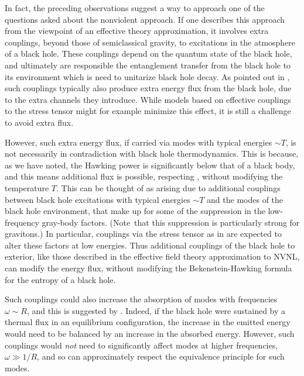 In fact, the preceding observations suggest a way to approach one of the questions asked about the nonviolent approach.  If one describes this approach from the viewpoint of an effective theory approximation,  it involves extra couplings, beyond those of semiclassical gravity, to excitations in the atmosphere of a black hole.  These couplings depend on the quantum state of the black hole, and ultimately are responsible the entanglement transfer from the black hole to its environment  which is need to unitarize black hole decay.  As pointed out in , such couplings typically also produce extra energy flux from the black hole, due to the extra channels they introduce.  While models based on effective couplings to the stress tensor might for example minimize this effect\NVNLT, it is still a challenge to avoid extra flux.  

However, such extra energy flux, if carried via modes with typical energies $\sim T$, is not necessarily in contradiction with black hole thermodynamics.  This is because, as we have noted, the Hawking power is significantly below that of a black body, and this means additional flux is  possible, respecting \SB, without modifying the temperature $T$.  This can be thought of as arising due to additional couplings between black hole excitations with typical energies $\sim T$ and the modes of the black hole environment, that make up for some of the suppression in the low-frequency gray-body factors.   (Note\Page\ that this suppression is particularly strong for gravitons.)  In particular, couplings via the stress tensor as in  are expected to alter these factors at low energies.
Thus additional couplings of the black hole to exterior,  like those described in the effective field theory approximation to NVNL,  can modify the energy flux, without modifying the Bekenstein-Hawking formula for the entropy of a black hole.

Such couplings could also increase the absorption of modes with frequencies $\omega\sim R$, and this is suggested by \pspec.  Indeed, if the black hole were sustained by a thermal flux in an equilibrium configuration, the increase in the emitted energy would need to be balanced by an increase in the absorbed energy.  However, such couplings would {\it not} need to significantly affect modes at higher frequencies, $\omega\gg1/R$, and so can approximately respect the equivalence principle for such modes.

